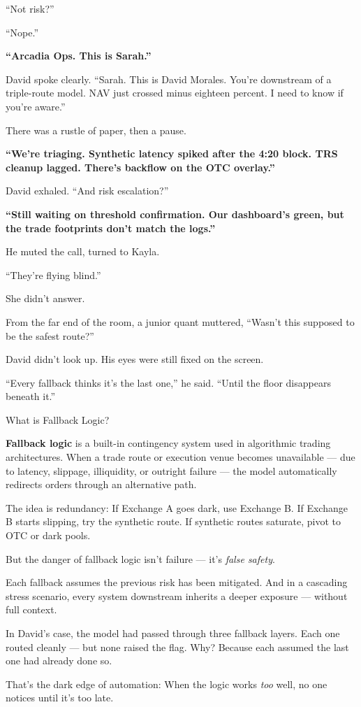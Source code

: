 “Not risk?”

“Nope.”

\textbf{“Arcadia Ops. This is Sarah.”}

David spoke clearly. “Sarah. This is David Morales. You’re downstream of a triple-route model. NAV just crossed 
minus eighteen percent. I need to know if you’re aware.”

There was a rustle of paper, then a pause.

\textbf{“We’re triaging. Synthetic latency spiked after the 4:20 block. TRS cleanup lagged. There’s backflow 
on the OTC overlay.”}

David exhaled. “And risk escalation?”

\textbf{“Still waiting on threshold confirmation. Our dashboard’s green, but the trade footprints 
don’t match the logs.”}

He muted the call, turned to Kayla.

“They’re flying blind.”

She didn’t answer.

From the far end of the room, a junior quant muttered, “Wasn’t this supposed to be the safest route?”

David didn’t look up. His eyes were still fixed on the screen.

“Every fallback thinks it’s the last one,” he said. “Until the floor disappears beneath it.”

\medskip

\begin{TechnicalSidebar}{What is Fallback Logic?}

  \textbf{Fallback logic} is a built-in contingency system used in algorithmic trading architectures.  
  When a trade route or execution venue becomes unavailable — due to latency, slippage, illiquidity, or outright failure —  
  the model automatically redirects orders through an alternative path.

  \medskip

  The idea is redundancy:  
  If Exchange A goes dark, use Exchange B.  
  If Exchange B starts slipping, try the synthetic route.  
  If synthetic routes saturate, pivot to OTC or dark pools.

  \medskip

  But the danger of fallback logic isn’t failure — it’s \textit{false safety}.

  \medskip

  Each fallback assumes the previous risk has been mitigated.  
  And in a cascading stress scenario, every system downstream inherits a deeper exposure — without full context.  

  \medskip

  In David’s case, the model had passed through three fallback layers.  
  Each one routed cleanly — but none raised the flag.  
  Why? Because each assumed the last one had already done so.

  \medskip

  That’s the dark edge of automation:  
  When the logic works \textit{too} well, no one notices until it’s too late.

\end{TechnicalSidebar}

